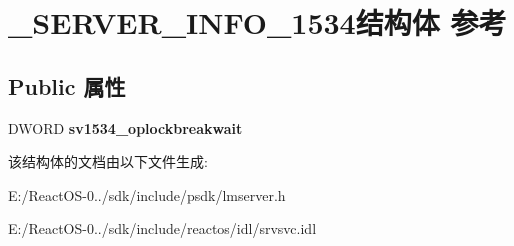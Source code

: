 \hypertarget{struct___s_e_r_v_e_r___i_n_f_o__1534}{}\section{\+\_\+\+S\+E\+R\+V\+E\+R\+\_\+\+I\+N\+F\+O\+\_\+1534结构体 参考}
\label{struct___s_e_r_v_e_r___i_n_f_o__1534}
\subsection*{Public 属性}
\begin{DoxyCompactItemize}
\item 
\mbox{\label{struct___s_e_r_v_e_r___i_n_f_o__1534_a347fb65f6f56ce7e0ebd9e022d853b84}} 
D\+W\+O\+RD {\bfseries sv1534\+\_\+oplockbreakwait}
\end{DoxyCompactItemize}


该结构体的文档由以下文件生成\+:\begin{DoxyCompactItemize}
\item 
E\+:/\+React\+O\+S-\/0../sdk/include/psdk/lmserver.\+h\item 
E\+:/\+React\+O\+S-\/0../sdk/include/reactos/idl/srvsvc.\+idl\end{DoxyCompactItemize}

